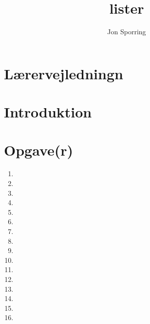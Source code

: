 \documentclass[a4paper,12pt]{article}
\title{lister}
\author{Jon Sporring}
\begin{document}
\maketitle

\section{Lærervejledningn}

\section{Introduktion}

\section{Opgave(r)}
\begin{enumerate}
\item 
\item 
\item 
\item 
\item 
\item 
\item 
\item 
\item 
\item 
\item 
\item 
\item 
\item 
\item 
\item 
\end{enumerate}
\end{document}
